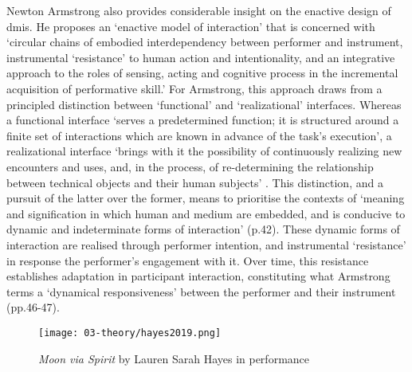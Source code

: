 Newton Armstrong also provides considerable insight on the enactive design of \glspl{dmi}. He proposes an `enactive model of interaction' that is concerned with `circular chains of embodied interdependency between performer and instrument, instrumental `resistance' to human action and intentionality, and an integrative approach to the roles of sensing, acting and cognitive process in the incremental acquisition of performative skill.' For Armstrong, this approach draws from a principled distinction between `functional' and `realizational' interfaces. Whereas a functional interface `serves a predetermined function; it is structured around a finite set of interactions which are known in advance of the task's execution', a realizational interface `brings with it the possibility of continuously realizing new encounters and uses, and, in the process, of re-determining the relationship between technical objects and their human subjects' \citep[p. v]{armstrong2006}. This distinction, and a pursuit of the latter over the former, means to prioritise the contexts of `meaning and signification in which human and medium are embedded, and is conducive to dynamic and indeterminate forms of interaction' (p.42). These dynamic forms of interaction are realised through performer intention, and instrumental `resistance' in response the performer's engagement with it. Over time, this resistance establishes adaptation in participant interaction, constituting what Armstrong terms a `dynamical responsiveness' between the performer and their instrument (pp.46-47). 

\begin{wrapfigure}{r}{0.45\textwidth}
    \vspace{-\intextsep}
    \hfill
    \begin{minipage}{0.95\linewidth}
        \texttt{[image: 03-theory/hayes2019.png]}
        \captionsetup{justification=justified}
        \caption{\textit{Moon via Spirit} by Lauren Sarah Hayes in performance \citep[taken by][]{slater2019}}\label{fig: slater2019}
    \end{minipage}
\end{wrapfigure}

